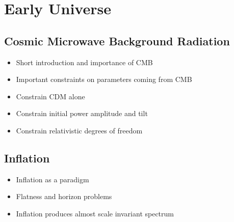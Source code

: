 \section{Early Universe}
\subsection{Cosmic Microwave Background Radiation}
\begin{itemize}
\item Short introduction and importance of CMB
\item Important constraints on parameters coming from CMB
\item Constrain CDM alone
\item Constrain initial power amplitude and tilt
\item Constrain relativistic degrees of freedom
\end{itemize}

\subsection{Inflation} 
\begin{itemize}
\item Inflation as a paradigm
\item Flatness and horizon problems
\item Inflation produces almost scale invariant spectrum
\end{itemize}





